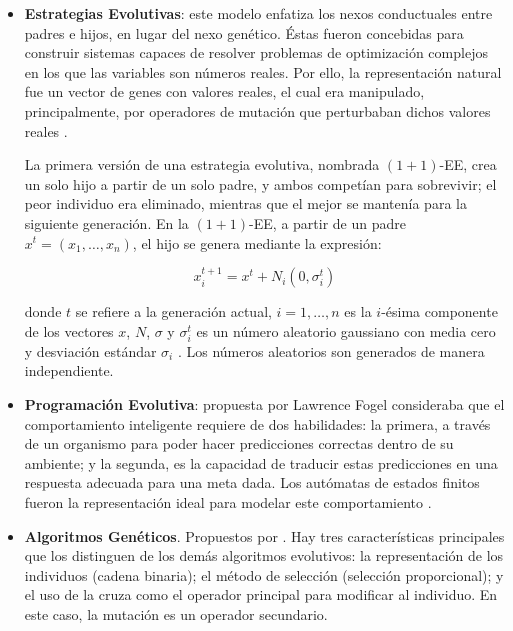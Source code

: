 \begin{itemize}
 \item \textbf{Estrategias Evolutivas}: este modelo enfatiza los nexos conductuales entre padres e hijos, en lugar del nexo gen\'etico. 
 \'Estas fueron concebidas para construir sistemas capaces de resolver problemas de optimizaci\'on complejos en los que las variables
 son n\'umeros reales. Por ello, la representaci\'on natural fue un vector de genes con valores reales, el cual era manipulado, principalmente, 
 por operadores de mutaci\'on que perturbaban dichos valores reales \cite{Back97}.

 La primera versi\'on de una estrategia evolutiva, nombrada $(1+1)$-EE, crea un solo hijo a partir de un solo padre, y ambos compet\'ian
 para sobrevivir; el peor individuo era eliminado, mientras que el mejor se manten\'ia para la siguiente generaci\'on. En la $(1+1)$-EE, 
 a partir de un padre $x^{t}=(x_1, \ldots, x_n )$, el hijo se genera mediante la expresi\'on:

 \[x^{t+1}_i=x^{t} + N_i(0, \sigma^{t}_i)\]

donde $t$ se refiere a la generaci\'on actual, $i = 1, \ldots, n$ es la $i$-\'esima componente de los vectores $x$, $N$, $\sigma$ y
$\sigma^{t}_i$ es un n\'umero aleatorio gaussiano con media cero y desviaci\'on est\'andar $\sigma_i$ . Los n\'umeros aleatorios 
son generados de manera independiente.

 \item \textbf{Programaci\'on Evolutiva}: propuesta por Lawrence Fogel consideraba que el comportamiento inteligente requiere de dos 
 habilidades: la primera, a trav\'es de un organismo para poder hacer predicciones correctas dentro de su ambiente; y la segunda, 
 es la capacidad de traducir estas predicciones en una respuesta adecuada para una 
 meta dada. Los aut\'omatas de estados finitos fueron la representaci\'on ideal para modelar este comportamiento \cite{Fogel64}. 

 \item \textbf{Algoritmos Gen\'eticos}. Propuestos por \cite{Holland75}. Hay tres caracter\'isticas principales que los distinguen 
 de los dem\'as algoritmos evolutivos: la representaci\'on de los individuos (cadena binaria); el m\'etodo de selecci\'on (selecci\'on 
 proporcional); y el uso de la cruza como el operador principal para modificar al individuo. En este caso, la mutaci\'on es un operador 
  secundario.

\end{itemize}

